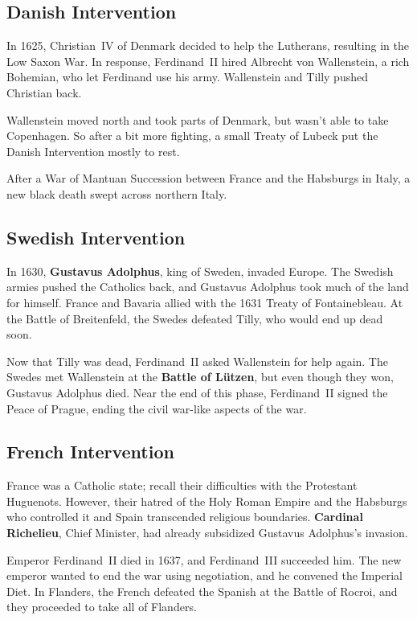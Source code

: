 \subsection*{Danish Intervention}

In 1625, Christian~IV of Denmark decided to help the Lutherans, resulting in the Low Saxon War.
In response, Ferdinand~II hired Albrecht von Wallenstein, a rich Bohemian,
who let Ferdinand use his army.
Wallenstein and Tilly pushed Christian back.

Wallenstein moved north and took parts of Denmark, but wasn't able to take Copenhagen.
So after a bit more fighting, a small Treaty of Lubeck put the Danish Intervention mostly to rest.

After a War of Mantuan Succession between France and the Habsburgs in Italy,
a new black death swept across northern Italy.

\subsection*{Swedish Intervention}

In 1630, \textbf{Gustavus Adolphus}, king of Sweden, invaded Europe.
The Swedish armies pushed the Catholics back, and Gustavus Adolphus took much of the land for himself.
France and Bavaria allied with the 1631 Treaty of Fontainebleau.
At the Battle of Breitenfeld, the Swedes defeated Tilly, who would end up dead soon.

Now that Tilly was dead, Ferdinand~II asked Wallenstein for help again.
The Swedes met Wallenstein at the \textbf{Battle of L\"utzen},
but even though they won, Gustavus Adolphus died.
Near the end of this phase, Ferdinand~II signed the Peace of Prague,
ending the civil war-like aspects of the war.

\subsection*{French Intervention}

France was a Catholic state; recall their difficulties with the Protestant Huguenots.
However, their hatred of the Holy Roman Empire and the Habsburgs who controlled it and Spain
transcended religious boundaries.
\textbf{Cardinal Richelieu}, Chief Minister, had already subsidized Gustavus Adolphus's invasion.

Emperor Ferdinand~II died in 1637, and Ferdinand~III succeeded him.
The new emperor wanted to end the war using negotiation, and he convened the Imperial Diet.
In Flanders, the French defeated the Spanish at the Battle of Rocroi,
and they proceeded to take all of Flanders.

